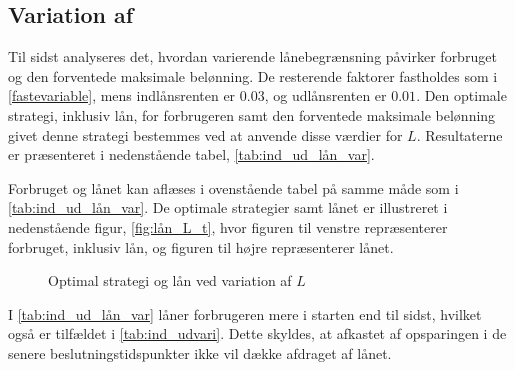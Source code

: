 
\subsection[Variation af  \texorpdfstring{$L$}{lånebegrænsning}]{Variation af } 

Til sidst analyseres det, hvordan varierende lånebegrænsning påvirker forbruget og den forventede maksimale belønning. De resterende faktorer fastholdes som i \eqref{fastevariable}, mens indlånsrenten er $0.03$, og udlånsrenten er $0.01$. Den optimale strategi, inklusiv lån, for forbrugeren samt den forventede maksimale belønning givet denne strategi bestemmes ved at anvende disse værdier for $L$. Resultaterne er præsenteret i nedenstående tabel, \autoref{tab:ind_ud_lån_var}.



Forbruget og lånet kan aflæses i ovenstående tabel på samme måde som i \autoref{tab:ind_ud_lån_var}. De optimale strategier samt lånet er illustreret i nedenstående figur, \autoref{fig:lån_L_t}, hvor figuren til venstre repræsenterer forbruget, inklusiv lån, og figuren til højre repræsenterer lånet. 

\begin{figure}[H]
    \begin{center}
        \resizebox{8cm}{!}{}
        \resizebox{8cm}{!}{}
    \end{center}
    \caption{Optimal strategi og lån ved variation af $L$ }\label{fig:lån_L_t}
\end{figure}

I \autoref{tab:ind_ud_lån_var} låner forbrugeren mere i starten end til sidst, hvilket også er tilfældet i \autoref{tab:ind_udvari}. Dette skyldes, at afkastet af opsparingen i de senere beslutningstidspunkter ikke vil dække afdraget af lånet. 


